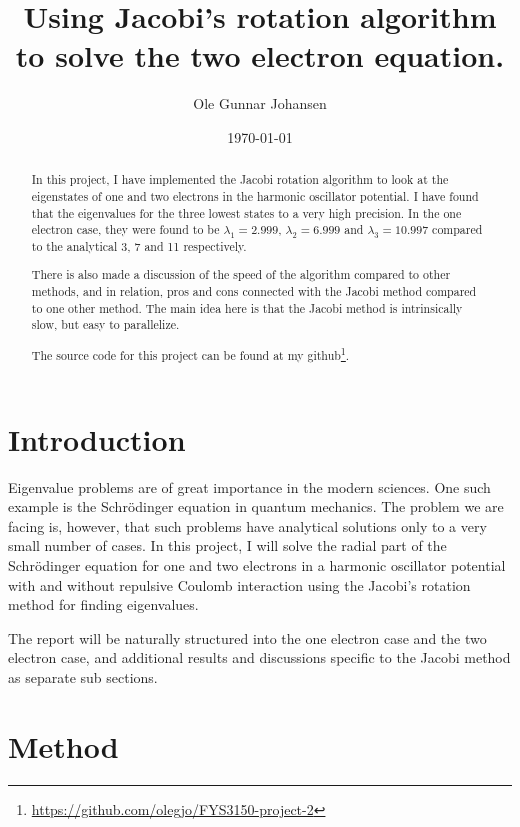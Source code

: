 \documentclass[11pt, a4paper]{article}
\title{Using Jacobi's rotation algorithm to solve the two electron \SL equation.}
\date{\today}
\author{Ole Gunnar Johansen}
\newcommand{\SL}{Schr\"{o}dinger }
\begin{document}
	\maketitle
	
	\begin{abstract}
		In this project, I have implemented the Jacobi rotation algorithm to look at the eigenstates of one and two electrons in the harmonic oscillator potential. I have found that the eigenvalues for the three lowest states to a very high precision. In the one electron case, they were found to be $\lambda_1 = 2.999$, $\lambda_2 = 6.999$ and $\lambda_3 = 10.997$ compared to the analytical 3, 7 and 11 respectively.
		
		There is also made a discussion of the speed of the algorithm compared to other methods, and in relation, pros and cons connected with the Jacobi method compared to one other method. The main idea here is that the Jacobi method is intrinsically  slow, but easy to parallelize. 
		
		The source code for this project can be found at my github\footnote{\url{https://github.com/olegjo/FYS3150-project-2}}.
	\end{abstract}
	
	\section{Introduction}
		Eigenvalue problems are of great importance in the modern sciences. One such example is the \SL equation in quantum mechanics. The problem we are facing is, however, that such problems have analytical solutions only to a very small number of cases. In this project, I will solve the radial part of the \SL equation for one and two electrons in a harmonic oscillator potential with and without repulsive Coulomb interaction using the Jacobi's rotation method for finding eigenvalues.
		
		The report will be naturally structured into the one electron case and the two electron case, and additional results and discussions specific to the Jacobi method as separate sub sections.

	
	\section{Method}
\end{document}
